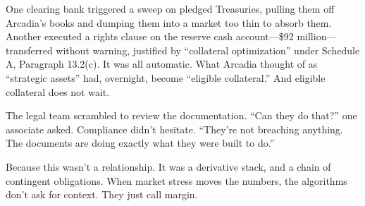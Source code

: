 \medskip

One clearing bank triggered a sweep on pledged Treasuries, pulling them off Arcadia’s books and dumping them into a market 
too thin to absorb them.
Another executed a rights clause on the reserve cash account—\$92 million—transferred without warning, justified by 
``collateral optimization'' under Schedule A, Paragraph 13.2(c).
It was all automatic.
What Arcadia thought of as ``strategic assets'' had, overnight, become ``eligible collateral.''
And eligible collateral does not wait.

The legal team scrambled to review the documentation.
``Can they do that?'' one associate asked.
Compliance didn’t hesitate. ``They’re not breaching anything. The documents are doing exactly what they were built to do.''

Because this wasn’t a relationship.
It was a derivative stack, and a chain of contingent obligations.
When market stress moves the numbers, the algorithms don’t ask for context.
They just call margin.

\medskip

